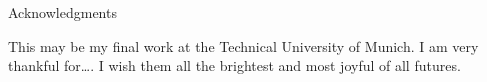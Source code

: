 {}
{}
\thispagestyle{empty}

\vspace*{20mm}

\begin{center}
{ Acknowledgments}
\end{center}

\vspace{10mm}
This may be my final work at the Technical University of Munich. I am very thankful for\ldots. I wish them all the brightest and most joyful of all futures.

\cleardoublepage{}
